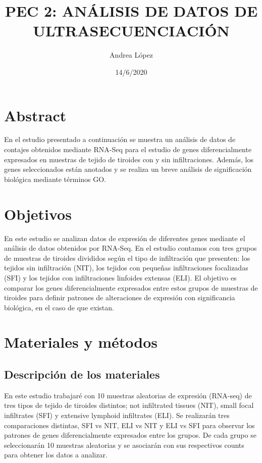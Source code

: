 \documentclass[
]{article}
\title{PEC 2: ANÁLISIS DE DATOS DE ULTRASECUENCIACIÓN}
\author{Andrea López}
\date{14/6/2020}
\begin{document}
\maketitle

\newpage
\tableofcontents
\newpage

\section{Abstract}

En el estudio presentado a continuación se muestra un análisis de datos
de contajes obtenidos mediante RNA-Seq para el estudio de genes
diferencialmente expresados en muestras de tejido de tiroides con y sin
infiltraciones. Además, los genes seleccionados están anotados y se
realiza un breve análisis de significación biológica mediante términos
GO.

\newpage
\section{Objetivos}

En este estudio se analizan datos de expresión de diferentes genes
mediante el análisis de datos obtenidos por RNA-Seq. En el estudio
contamos con tres grupos de muestras de tiroides divididos según el tipo
de infiltración que presenten: los tejidos sin infiltración (NIT), los
tejidos con pequeñas infiltraciones focalizadas (SFI) y los tejidos con
infiltraciones linfoides extensas (ELI). El objetivo es comparar los
genes diferencialmente expresados entre estos grupos de muestras de
tiroides para definir patrones de alteraciones de expresión con
significancia biológica, en el caso de que existan. \newpage

\section{Materiales y métodos}

\subsection{Descripción de los materiales}

En este estudio trabajaré con 10 muestras aleatorias de expresión
(RNA-seq) de tres tipos de tejido de tiroides distintos; not infiltrated
tissues (NIT), small focal infiltrates (SFI) y extensive lymphoid
infiltrates (ELI). Se realizarán tres comparaciones distintas, SFI vs
NIT, ELI vs NIT y ELI vs SFI para observar los patrones de genes
diferencialmente expresados entre los grupos. De cada grupo se
seleccionarán 10 muestras aleatorias y se asociarán con sus respectivos
counts para obtener los datos a analizar.
\end{document}
